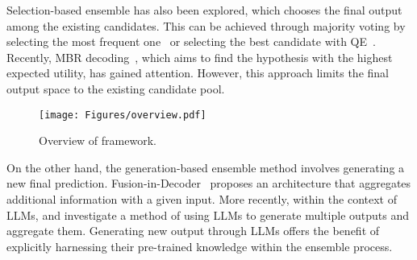 Selection-based ensemble has also been explored, which chooses the final output among the existing candidates.
This can be achieved through majority voting by selecting the most frequent one~\cite{wang2022rationaleaugmented} or selecting the best candidate with QE~\cite{fernandes-etal-2022-quality, howgood}.
Recently, MBR decoding~\cite{GOEL2000115, mbr}, which aims to find the hypothesis with the highest expected utility, has gained attention.
However, this approach limits the final output space to the existing candidate pool.


\begin{figure*}[t]
  \centering
  \texttt{[image: Figures/overview.pdf]} 
  \caption{Overview of \ours framework.}
  \label{fig:overall}
\end{figure*}


On the other hand, the generation-based ensemble method involves generating a new final prediction.
Fusion-in-Decoder~\cite{fid} proposes an architecture that aggregates additional information with a given input.
More recently, within the context of LLMs, \citet{llm-blender} and \citet{exchangeofthought} investigate a method of using LLMs to generate multiple outputs and aggregate them.
Generating new output through LLMs offers the benefit of explicitly harnessing their pre-trained knowledge within the ensemble process.